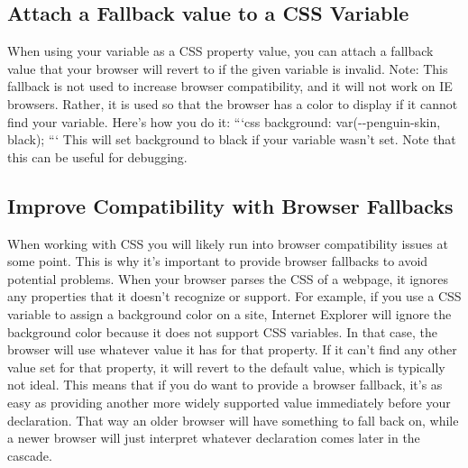 \documentclass{article}%
\begin{document}
\subsection{Attach a Fallback value to a CSS Variable}%
\label{subsec:AttachaFallbackvaluetoaCSSVariable}%
When using your variable as a CSS property value, you can attach a fallback value that your browser will revert to if the given variable is invalid.\newline%
Note: This fallback is not used to increase browser compatibility, and it will not work on IE browsers. Rather, it is used so that the browser has a color to display if it cannot find your variable.\newline%
Here's how you do it:\newline%
```css\newline%
background: var({-}{-}penguin{-}skin, black);\newline%
```\newline%
This will set background to black if your variable wasn't set.\newline%
Note that this can be useful for debugging.\newline%

%
\subsection{Improve Compatibility with Browser Fallbacks}%
\label{subsec:ImproveCompatibilitywithBrowserFallbacks}%
When working with CSS you will likely run into browser compatibility issues at some point. This is why it's important to provide browser fallbacks to avoid potential problems.\newline%
When your browser parses the CSS of a webpage, it ignores any properties that it doesn't recognize or support. For example, if you use a CSS variable to assign a background color on a site, Internet Explorer will ignore the background color because it does not support CSS variables. In that case, the browser will use whatever value it has for that property. If it can't find any other value set for that property, it will revert to the default value, which is typically not ideal.\newline%
This means that if you do want to provide a browser fallback, it's as easy as providing another more widely supported value immediately before your declaration. That way an older browser will have something to fall back on, while a newer browser will just interpret whatever declaration comes later in the cascade.\newline%
\end{document}
